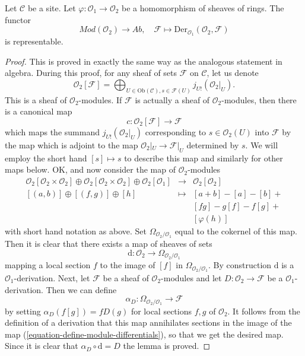 \begin{lemma}
\label{lemma-universal-module}
Let $\mathcal{C}$ be a site. Let $\varphi : \mathcal{O}_1 \to \mathcal{O}_2$
be a homomorphism of sheaves of rings. The functor
$$
\textit{Mod}(\mathcal{O}_2) \longrightarrow \textit{Ab},\quad
\mathcal{F} \longmapsto \text{Der}_{\mathcal{O}_1}(\mathcal{O}_2, \mathcal{F})
$$
is representable.
\end{lemma}

\begin{proof}
This is proved in exactly the same way as the analogous statement in algebra.
During this proof, for any sheaf of sets $\mathcal{F}$ on $\mathcal{C}$,
let us denote
$$
\mathcal{O}_2[\mathcal{F}]
=
\bigoplus\nolimits_{U \in \text{Ob}(\mathcal{C}), s \in \mathcal{F}(U)}
j_{U!}(\mathcal{O}_2|_U).
$$
This is a sheaf of $\mathcal{O}_2$-modules.
If $\mathcal{F}$ is actually a sheaf of $\mathcal{O}_2$-modules, then there
is a canonical map
$$
c : \mathcal{O}_2[\mathcal{F}] \longrightarrow \mathcal{F}
$$
which maps the summand $j_{U!}(\mathcal{O}_2|_U)$ corresponding to
$s \in \mathcal{O}_2(U)$ into $\mathcal{F}$ by the map which is
adjoint to the map $\mathcal{O}_2|_U \to \mathcal{F}|_U$ determined by $s$.
We will employ the short hand $[s] \mapsto s$ to
describe this map and similarly for other maps below. OK, and now consider
the map of $\mathcal{O}_2$-modules
\begin{equation}
\label{equation-define-module-differentials}
\begin{matrix}
\mathcal{O}_2[\mathcal{O}_2 \times \mathcal{O}_2] \oplus
\mathcal{O}_2[\mathcal{O}_2 \times \mathcal{O}_2] \oplus
\mathcal{O}_2[\mathcal{O}_1] &
\longrightarrow &
\mathcal{O}_2[\mathcal{O}_2] \\
[(a, b)] \oplus [(f, g)] \oplus [h] & \longmapsto & [a + b] - [a] - [b] + \\
& & [fg] - g[f] - f[g] + \\
& & [\varphi(h)]
\end{matrix}
\end{equation}
with short hand notation as above. Set $\Omega_{\mathcal{O}_2/\mathcal{O}_1}$
equal to the cokernel of this map. Then it is clear that there exists
a map of sheaves of sets
$$
\text{d} : \mathcal{O}_2 \longrightarrow \Omega_{\mathcal{O}_2/\mathcal{O}_1}
$$
mapping a local section $f$ to the image of $[f]$ in
$\Omega_{\mathcal{O}_2/\mathcal{O}_1}$. By construction $\text{d}$
is a $\mathcal{O}_1$-derivation. Next, let $\mathcal{F}$
be a sheaf of $\mathcal{O}_2$-modules and let
$D : \mathcal{O}_2 \to \mathcal{F}$ be a $\mathcal{O}_1$-derivation.
Then we can define
$$
\alpha_D : \Omega_{\mathcal{O}_2/\mathcal{O}_1} \longrightarrow \mathcal{F}
$$
by setting $\alpha_D(f[g]) = fD(g)$ for local sections
$f, g$ of $\mathcal{O}_2$. It follows from the definition of a
derivation that this map annihilates sections in the image of the map
(\ref{equation-define-module-differentials}), so that we get the
desired map. Since it is clear that $\alpha_D \circ \text{d} = D$
the lemma is proved.
\end{proof}

